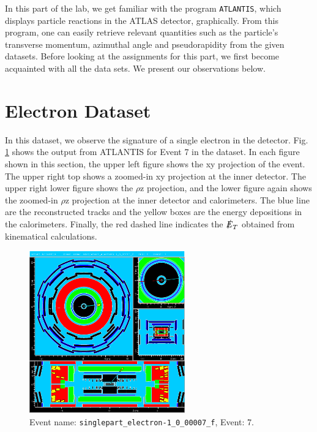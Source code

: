 \documentclass[a4paper]{report}
\numberwithin{equation}{section}
\begin{document}
In this part of the lab, we get familiar with the program \texttt{ATLANTIS}, which displays particle reactions in the ATLAS detector, graphically. 
From this program, one can easily retrieve relevant quantities such as the particle's transverse momentum, azimuthal angle and pseudorapidity
from the given datasets. 
Before looking at the assignments for this part, we first become acquainted with all the data sets. We present our observations below. 

\section{Electron Dataset}

In this dataset, we observe the signature of a single electron in the detector. Fig. \ref{fig:single_e} shows the output from ATLANTIS for Event 7 in the 
dataset. In each figure shown in this section, the upper left figure shows the xy projection of the 
event. The upper right top shows a zoomed-in xy projection at the inner detector. The upper right lower figure shows the $\rho$z 
projection, and the lower figure again shows the zoomed-in $\rho$z projection at the inner detector and calorimeters. The blue line
 are the reconstructed tracks and the yellow boxes are the energy depositions in the calorimeters. Finally, the red dashed line 
 indicates the $\slashed{E}_T$ obtained from kinematical calculations.

\begin{figure}[htpb]
    \centering
    \includegraphics[width=0.6\textwidth]{electron_event7.eps}
    \caption{Event name: \texttt{singlepart\_electron-1\_0\_00007\_f}, Event: 7. }
    \label{fig:single_e}
\end{figure}
\end{document}
